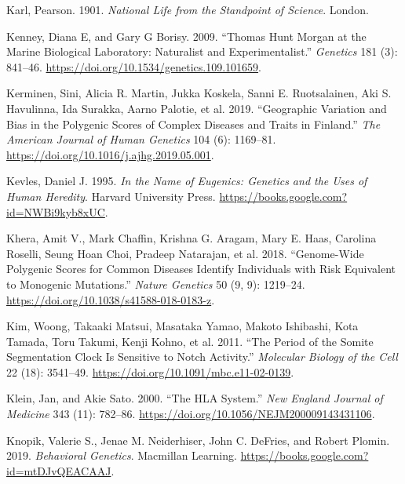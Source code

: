 \documentclass[
]{book}
\newlength{\cslhangindent}
\newlength{\cslentryspacingunit} %
\newenvironment{CSLReferences}[2] %
 {%
  \setlength{\parindent}{0pt}
  \ifodd #1
  \let\oldpar\par
  \def\par{\hangindent=\cslhangindent\oldpar}
  \fi
  \setlength{\parskip}{#2\cslentryspacingunit}
 }%
 {}
\begin{document}
\begin{CSLReferences}{1}{0}
\leavevmode{}%
Karl, Pearson. 1901. \emph{National {Life} from the Standpoint of {Science}}. {London}.

\leavevmode{}%
Kenney, Diana E, and Gary G Borisy. 2009. {``Thomas {Hunt Morgan} at the {Marine Biological Laboratory}: {Naturalist} and {Experimentalist}.''} \emph{Genetics} 181 (3): 841--46. \url{https://doi.org/10.1534/genetics.109.101659}.

\leavevmode{}%
Kerminen, Sini, Alicia R. Martin, Jukka Koskela, Sanni E. Ruotsalainen, Aki S. Havulinna, Ida Surakka, Aarno Palotie, et al. 2019. {``Geographic {Variation} and {Bias} in the {Polygenic Scores} of {Complex Diseases} and {Traits} in {Finland}.''} \emph{The American Journal of Human Genetics} 104 (6): 1169--81. \url{https://doi.org/10.1016/j.ajhg.2019.05.001}.

\leavevmode{}%
Kevles, Daniel J. 1995. \emph{In the {Name} of {Eugenics}: {Genetics} and the {Uses} of {Human Heredity}}. {Harvard University Press}. \url{https://books.google.com?id=NWBi9kyb8xUC}.

\leavevmode{}%
Khera, Amit V., Mark Chaffin, Krishna G. Aragam, Mary E. Haas, Carolina Roselli, Seung Hoan Choi, Pradeep Natarajan, et al. 2018. {``Genome-Wide Polygenic Scores for Common Diseases Identify Individuals with Risk Equivalent to Monogenic Mutations.''} \emph{Nature Genetics} 50 (9, 9): 1219--24. \url{https://doi.org/10.1038/s41588-018-0183-z}.

\leavevmode{}%
Kim, Woong, Takaaki Matsui, Masataka Yamao, Makoto Ishibashi, Kota Tamada, Toru Takumi, Kenji Kohno, et al. 2011. {``The Period of the Somite Segmentation Clock Is Sensitive to {Notch} Activity.''} \emph{Molecular Biology of the Cell} 22 (18): 3541--49. \url{https://doi.org/10.1091/mbc.e11-02-0139}.

\leavevmode{}%
Klein, Jan, and Akie Sato. 2000. {``The {HLA System}.''} \emph{New England Journal of Medicine} 343 (11): 782--86. \url{https://doi.org/10.1056/NEJM200009143431106}.

\leavevmode{}%
Knopik, Valerie S., Jenae M. Neiderhiser, John C. DeFries, and Robert Plomin. 2019. \emph{Behavioral {Genetics}}. {Macmillan Learning}. \url{https://books.google.com?id=mtDJvQEACAAJ}.


\end{CSLReferences}
\end{document}
